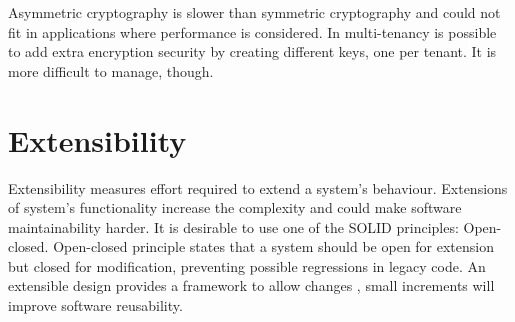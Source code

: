 \documentclass[12pt,english]{article} %
\begin{document}
Asymmetric cryptography is slower than symmetric cryptography and could not fit in applications where performance is considered.
In multi-tenancy is possible to add extra encryption security by creating different keys, one per tenant.
It is more difficult to manage, though.


\newpage
\section{Extensibility}
Extensibility measures effort required to extend a system's behaviour.
Extensions of system's functionality increase the complexity and could make software maintainability harder.
It is desirable to use one of the SOLID principles: Open-closed.
Open-closed principle states that a system should be open for extension but closed for modification, preventing possible regressions in legacy code.
An extensible design provides a framework to allow changes \cite{philosophy-extensible-software}, small increments will improve software reusability.

\
\end{document}
